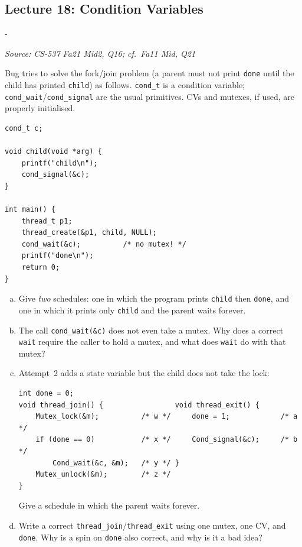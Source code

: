 \documentclass[11pt,a4paper]{article}
\makeatletter
\newcommand{\keepspace}[1]{\par\penalty-100\begingroup
  \setlength{\dimen@}{#1}\dimen@ii\pagegoal\advance\dimen@ii-\pagetotal
  \ifdim\dimen@>\dimen@ii\ifdim\dimen@ii>\z@\vfil\fi\break\fi\endgroup}
\newcounter{qn}[section]
\newenvironment{Qn}[4]{%
  \refstepcounter{qn}\keepspace{7\baselineskip}%
  \begin{tcolorbox}[qboxstyle, title={Q\thesection.\theqn\ \ [#1 \textbar\ #2]\ \ #4}]%
  {\footnotesize\color{g3}\textit{Source: #3}}\par\smallskip%
}{%
  \end{tcolorbox}%
}
\makeatother
\begin{document}
\subsection{Lecture 18: Condition Variables}

\begin{Qn}{Hard}{Lect 18}{CS-537 Fa21 Mid2, Q16; cf.\ Fa11 Mid, Q21}{Join with a CV: missing mutex, missing state, lost wakeup}
Bug tries to solve the fork/join problem (a parent must not print
\texttt{done} until the child has printed \texttt{child}) as follows.
\texttt{cond\_t} is a condition variable; \texttt{cond\_wait}/\texttt{cond\_signal}
are the usual primitives. CVs and mutexes, if used, are properly initialised.
\begin{lstlisting}[numbers=none]
cond_t c;

void child(void *arg) {
    printf("child\n");
    cond_signal(&c);
}

int main() {
    thread_t p1;
    thread_create(&p1, child, NULL);
    cond_wait(&c);          /* no mutex! */
    printf("done\n");
    return 0;
}
\end{lstlisting}
\begin{enumerate}[(a)]
\item Give \emph{two} schedules: one in which the program prints
      \texttt{child} then \texttt{done}, and one in which it prints only
      \texttt{child} and the parent waits forever.
\item The call \texttt{cond\_wait(\&c)} does not even take a mutex.
      Why does a correct \texttt{wait} require the caller to hold a mutex,
      and what does \texttt{wait} do with that mutex?
\item Attempt~2 adds a state variable but the child does not take the
      lock:
\begin{lstlisting}[numbers=none]
int done = 0;
void thread_join() {                 void thread_exit() {
    Mutex_lock(&m);          /* w */     done = 1;            /* a */
    if (done == 0)           /* x */     Cond_signal(&c);     /* b */
        Cond_wait(&c, &m);   /* y */ }
    Mutex_unlock(&m);        /* z */
}
\end{lstlisting}
      Give a schedule in which the parent waits forever.
\item Write a correct \texttt{thread\_join}/\texttt{thread\_exit} using one
      mutex, one CV, and \texttt{done}. Why is a spin on \texttt{done}
      also correct, and why is it a bad idea?
\end{enumerate}
\end{Qn}
\end{document}
